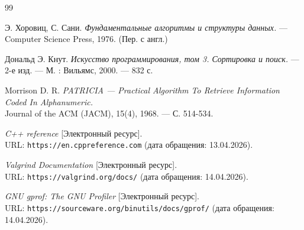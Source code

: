 \begin{thebibliography}{99}

    Э. Хоровиц, С. Сани. 
    {\itshape Фундаментальные алгоритмы и структуры данных.} --- Computer Science Press, 1976. (Пер. с англ.)
    
    Дональд Э. Кнут. 
    {\itshape Искусство программирования, том 3. Сортировка и поиск.} --- 2-е изд. --- М. : Вильямс, 2000. --- 832 с.
    
    Morrison D. R. 
    {\itshape PATRICIA — Practical Algorithm To Retrieve Information Coded In Alphanumeric.} \\
    Journal of the ACM (JACM), 15(4), 1968. --- С. 514-534.
    
    {\itshape C++ reference} [Электронный ресурс]. \\
    URL: \texttt{https://en.cppreference.com} (дата обращения: 13.04.2026).
    
    {\itshape Valgrind Documentation} [Электронный ресурс]. \\
    URL: \texttt{https://valgrind.org/docs/} (дата обращения: 14.04.2026).
    
    {\itshape GNU gprof: The GNU Profiler} [Электронный ресурс]. \\
    URL: \texttt{https://sourceware.org/binutils/docs/gprof/} (дата обращения: 14.04.2026).
    
    \end{thebibliography}